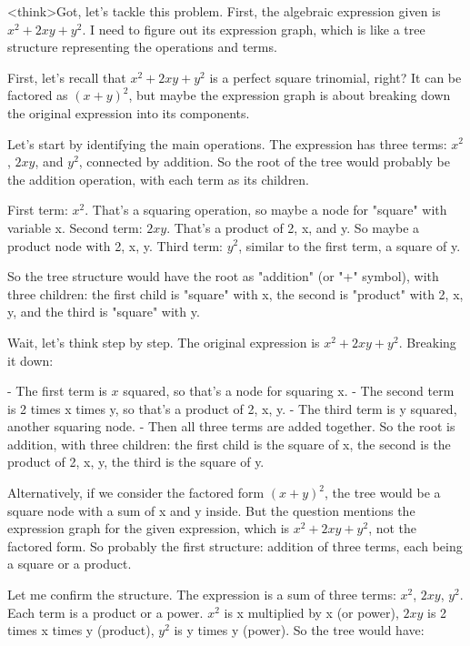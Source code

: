 <think>Got, let's tackle this problem. First, the algebraic expression given is \( x^2 + 2xy + y^2 \). I need to figure out its expression graph, which is like a tree structure representing the operations and terms. 

First, let's recall that \( x^2 + 2xy + y^2 \) is a perfect square trinomial, right? It can be factored as \( (x + y)^2 \), but maybe the expression graph is about breaking down the original expression into its components. 

Let's start by identifying the main operations. The expression has three terms: \( x^2 \), \( 2xy \), and \( y^2 \), connected by addition. So the root of the tree would probably be the addition operation, with each term as its children. 

First term: \( x^2 \). That's a squaring operation, so maybe a node for "square" with variable x. Second term: \( 2xy \). That's a product of 2, x, and y. So maybe a product node with 2, x, y. Third term: \( y^2 \), similar to the first term, a square of y. 

So the tree structure would have the root as "addition" (or "+" symbol), with three children: the first child is "square" with x, the second is "product" with 2, x, y, and the third is "square" with y. 

Wait, let's think step by step. The original expression is \( x^2 + 2xy + y^2 \). Breaking it down:

- The first term is \( x \) squared, so that's a node for squaring x.
- The second term is 2 times x times y, so that's a product of 2, x, y.
- The third term is y squared, another squaring node.
- Then all three terms are added together. So the root is addition, with three children: the first child is the square of x, the second is the product of 2, x, y, the third is the square of y.

Alternatively, if we consider the factored form \( (x + y)^2 \), the tree would be a square node with a sum of x and y inside. But the question mentions the expression graph for the given expression, which is \( x^2 + 2xy + y^2 \), not the factored form. So probably the first structure: addition of three terms, each being a square or a product.

Let me confirm the structure. The expression is a sum of three terms: \( x^2 \), \( 2xy \), \( y^2 \). Each term is a product or a power. \( x^2 \) is x multiplied by x (or power), \( 2xy \) is 2 times x times y (product), \( y^2 \) is y times y (power). So the tree would have:

